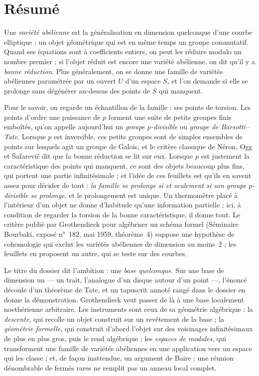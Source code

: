 \documentclass[11pt,a4paper]{article}
\begin{document}
\section*{Résumé}

\begin{resume}
Une \emph{variété abélienne} est la généralisation en dimension quelconque
d'une courbe elliptique : un objet géométrique qui est en même temps un
groupe commutatif. Quand ses équations sont à coefficients entiers, on peut
les réduire modulo un nombre premier ; si l'objet réduit est encore une
variété abélienne, on dit qu'il y a \emph{bonne réduction}. Plus
généralement, on se donne une famille de variétés abéliennes paramétrée par
un ouvert $U$ d'un espace $S$, et l'on demande si elle se prolonge sans
dégénérer au-dessus des points de $S$ qui manquent.

Pour le savoir, on regarde un échantillon de la famille : ses points de
torsion. Les points d'ordre une puissance de $p$ forment une suite de petits
groupes finis emboîtés, qu'on appelle aujourd'hui un \emph{groupe
$p$-divisible} ou \emph{groupe de Barsotti--Tate}. Lorsque $p$ est inversible,
ces petits groupes sont de simples ensembles de points sur lesquels agit un
groupe de Galois, et le critère classique de Néron, Ogg et Šafarevič dit que
la bonne réduction se lit sur eux. Lorsque $p$ est justement la
caractéristique des points qui manquent, ce sont des objets beaucoup plus
fins, qui portent une partie infinitésimale ; et l'idée de ces feuillets est
qu'ils en savent assez pour décider de tout : \emph{la famille se prolonge si
et seulement si son groupe $p$-divisible se prolonge}, et le prolongement est
unique. Un thermomètre placé à l'intérieur d'un objet ne donne d'habitude
qu'une information partielle ; ici, à condition de regarder la torsion de la
bonne caractéristique, il donne tout. Le critère publié par Grothendieck pour algébriser un schéma formel (Séminaire Bourbaki, exposé n°~182, mai 1959, théorème~4) suppose une hypothèse de cohomologie qui exclut les variétés abéliennes de dimension au moins~2 ; les feuillets en proposent un autre, qui se teste sur des courbes.

Le titre du dossier dit l'ambition : une \emph{base quelconque}. Sur une base
de dimension un --- un trait, l'analogue d'un disque autour d'un point ---,
l'énoncé découle d'un théorème de Tate, et un tapuscrit annoté rangé dans le
dossier en donne la démonstration. Grothendieck veut passer de là à une base
localement noethérienne arbitraire. Les instruments sont ceux de sa géométrie
algébrique : la \emph{descente}, qui recolle un objet construit sur un
revêtement de la base ; la \emph{géométrie formelle}, qui construit d'abord
l'objet sur des voisinages infinitésimaux de plus en plus gros, puis le rend
algébrique ; les \emph{espaces de modules}, qui transforment une famille de
variétés abéliennes en une application vers un espace qui les classe ; et,
de façon inattendue, un argument de Baire : une réunion dénombrable de
fermés rares ne remplit pas un anneau local complet.


\end{resume}
\end{document}
